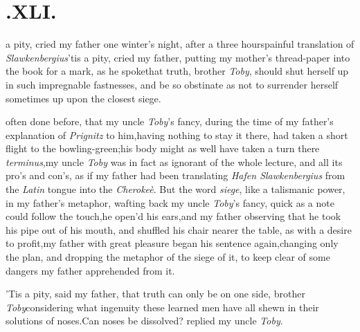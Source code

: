 \documentclass{article}
\begin{document}
\vfill


\newpage
\section{.\quad  XLI.}

 a pity, cried my father
one winter’s night, after a three hours\break painful translation
of \textit{Slawkenbergius}\tsk ’tis a pity, cried my
father, putting my mother’s thread-paper into the book for a
mark, as he spoke\tsh that truth, bro\-ther \textit{Toby},
should shut herself up in such impregnable fastnesses, and be so
obstinate as not to surrender herself sometimes up upon the closest
siege.\tsh

\noindent
{} often
done before, that my uncle \textit{Toby}’s fancy, during the
time of my father’s explanation of \textit{Prignitz} to
him,\tsh having nothing to stay it there, had taken a short
flight to the bowling-green;\tsh his body might as well have
taken a turn there
\textit{terminus},\tsh my uncle \textit{Toby} was in fact\break
as ignorant
of the whole lecture, and all its pro’s and con’s, as if my
father had been translating \textit{Hafen Slawkenbergius}\break
from the \textit{Latin} tongue into the \textit{Cherokeè}.
But the word \textit{siege}, like a talismanic\break
power, in my
father’s metaphor, wafting back my uncle \textit{Toby}’s
fancy, quick as a note could follow the touch,\tsk he open’d
his ears,\tsk and my father observing that he took his pipe
out of his mouth, and shuffled his chair nearer the table,
as with a desire to profit,\tsk my father with great
pleasure began his sentence again,\tsh changing only the
plan, and dropping the metaphor of the siege of it, to keep
clear of some dangers my father apprehended from it.

\smallskip
{}

\newpage
’Tis a pity, said my father, that truth can only be on one
side, brother \textit{Toby}\tsh considering what ingenuity
these learned men have all shewn in their solutions of
noses.\tsh Can noses be dissolved? repli\-ed my uncle
\textit{Toby}.\tsh
\end{document}
